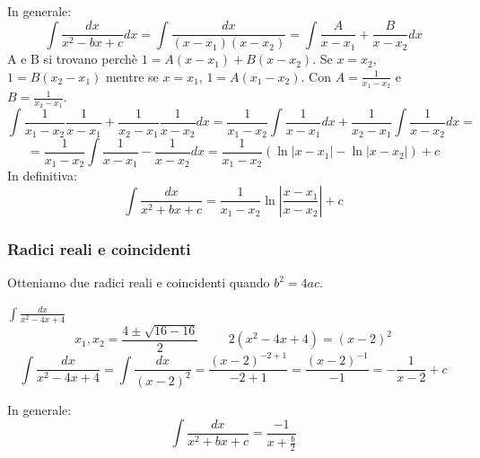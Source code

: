 In generale:
\begin{equation*}\int\frac{dx}{x^2-bx+c}dx=\int\frac{dx}{(x-x_1)(x-x_2)}=\int\frac{A}{x-x_1}+\frac{B}{x-x_2}dx\end{equation*}
A e B si trovano perchè $1=A(x-x_1)+B(x-x_2)$. Se $x=x_2$, $1=B(x_2-x_1)$ mentre se $x=x_1$, $1=A(x_1-x_2)$. Con $A=\frac{1}{x_1-x_2}$ e $B=\frac{1}{x_2-x_1}$.
\begin{equation*}\int\frac{1}{x_1-x_2}\frac{1}{x-x_1}+\frac{1}{x_2-x_1}\frac{1}{x-x_2}dx=\frac{1}{x_1-x_2}\int\frac{1}{x-x_1}dx+\frac{1}{x_2-x_1}\int\frac{1}{x-x_2}dx=\end{equation*}
\begin{equation*}=\frac{1}{x_1-x_2}\int\frac{1}{x-x_1}-\frac{1}{x-x_2}dx=\frac{1}{x_1-x_2}(\ln|x-x_1|-\ln|x-x_2|)+c\end{equation*}
In definitiva:
\begin{equation*}
\int\frac{dx}{x^2+bx+c}=\frac{1}{x_1-x_2}\ln|\frac{x-x_1}{x-x_2}|+c
\end{equation*}

\subsubsection{Radici reali e coincidenti}
Otteniamo due radici reali e coincidenti quando $b^2=4ac$.
\begin{example} $\int\frac{dx}{x^2-4x+4}$
\begin{equation*}x_1,x_2=\frac{4\pm\sqrt{16-16}}{2}\hspace{1cm}2(x^2-4x+4)=(x-2)^2\end{equation*}
\begin{equation*}\int\frac{dx}{x^2-4x+4}=\int\frac{dx}{(x-2)^2}=\frac{(x-2)^{-2+1}}{-2+1}=\frac{(x-2)^{-1}}{-1}=-\frac{1}{x-2}+c\end{equation*}
\end{example}

In generale:
\begin{equation*}
    \int\frac{dx}{x^2+bx+c}=\frac{-1}{x+\frac{b}{2}}
\end{equation*}

